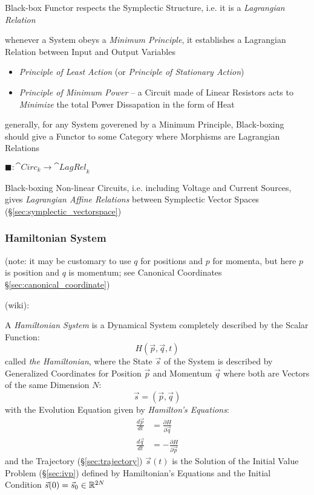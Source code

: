 Black-box Functor respects the Symplectic Structure, i.e. it is a
\emph{Lagrangian Relation}

whenever a System obeys a \emph{Minimum Principle}, it establishes a Lagrangian
Relation between Input and Output Variables

\begin{itemize}
  \item \emph{Principle of Least Action} (or \emph{Principle of Stationary
    Action})
  \item \emph{Principle of Minimum Power} -- a Circuit made of Linear Resistors
    acts to \emph{Minimize} the total Power Dissapation in the form of Heat
\end{itemize}

generally, for any System goverened by a Minimum Principle, Black-boxing should
give a Functor to some Category where Morphisms are Lagrangian Relations

$\blacksquare : \cat{Circ}_k \rightarrow \cat{LagRel}_k$

Black-boxing Non-linear Circuits, i.e. including Voltage and Current Sources,
gives \emph{Lagrangian Affine Relations} between Symplectic Vector Spaces
(\S\ref{sec:symplectic_vectorspace})



\subsubsection{Hamiltonian System}\label{sec:hamiltonian_system}

(note: it may be customary to use $q$ for positions and $p$ for momenta, but
here $p$ is position and $q$ is momentum; see Canonical Coordinates
\S\ref{sec:canonical_coordinate})

(wiki):

A \emph{Hamiltonian System} is a Dynamical System completely described by the
Scalar Function:
\[
  H(\vec{p},\vec{q},t)
\]
called \emph{the Hamiltonian}, where the State $\vec{s}$ of the System is
described by Generalized Coordinates for Position $\vec{p}$ and Momentum
$\vec{q}$ where both are Vectors of the same Dimension $N$:
\[
  \vec{s} = (\vec{p},\vec{q})
\]
with the Evolution Equation given by \emph{Hamilton's Equations}:
\begin{align*}
  \frac{d\vec{p}}{dt} & = \frac{\partial{H}}{\partial{\vec{q}}} \\
  \frac{d\vec{q}}{dt} & = -\frac{\partial{H}}{\partial{\vec{p}}}
\end{align*}
and the Trajectory (\S\ref{sec:trajectory}) $\vec{s}(t)$ is the Solution of
the Initial Value Problem (\S\ref{sec:ivp}) defined by Hamiltonian's Equations
and the Initial Condition $\vec{s}(0) = \vec{s}_0 \in \mathbb{R}^{2N}$

